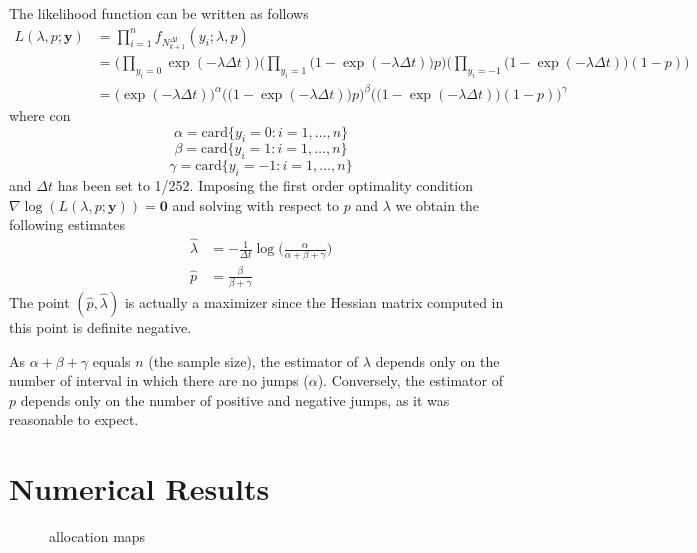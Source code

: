The likelihood function can be written as follows
\begin{equation*}
\begin{split}
L(\lambda,p;\mathbf{y}) & = \prod_{i=1}^{n}f_{N^{\Delta t}_{k+1}}(y_i;\lambda,p)\\
& =\Big(\prod_{y_i = 0}\exp(-\lambda\Delta t) \Big)
\Big(\prod_{y_i=1}\big(1-\exp(-\lambda\Delta t) \big)p \Big)
\Big(\prod_{y_i=-1}\big(1-\exp(-\lambda\Delta t)\big)(1-p) \Big)\\
& = \Big(\exp(-\lambda\Delta t) \Big)^\alpha
\Big(\big(1-\exp(-\lambda\Delta t) \big)p \Big)^\beta
\Big(\big(1-\exp(-\lambda\Delta t)\big)(1-p) \Big)^\gamma
\end{split}
\end{equation*}
where 
con 
\[ \alpha =  \text{card}\{y_i = 0 \colon i = 1,\ldots,n\}\]
\[ \beta =  \text{card}\{y_i = 1 \colon i = 1,\ldots,n\}\]
\[ \gamma =  \text{card}\{y_i = -1 \colon i = 1,\ldots,n\}\]
and $\Delta t$ has been set to 1/252. Imposing the first order optimality condition $\nabla \log(L(\lambda,p;\mathbf{y}))=\bm{0}$
and solving with respect to $p$ and $\lambda$ we obtain the following estimates
\begin{align}
\widehat{\lambda} &= -\frac{1}{\Delta t}\log\Big(\frac{\alpha}{\alpha+\beta+\gamma}\Big)\\[2ex]
\widehat{p}& = \frac{\beta}{\beta+\gamma}
\end{align}
The point $(\widehat{p},\widehat{\lambda})$ is actually a maximizer since the Hessian matrix computed in this point is definite negative.
\begin{remark}
	As $\alpha+\beta+\gamma$ equals $n$ (the sample size), the estimator of $\lambda$ depends only on the number of interval in which there are no jumps ($\alpha$). Conversely, the estimator of $p$ depends only on the number of positive and negative jumps, as it was reasonable to expect.  
\end{remark}
\section{Numerical Results}
\begin{figure}
	\caption{allocation maps}
	\label{fig:basic_maps}
\end{figure}


